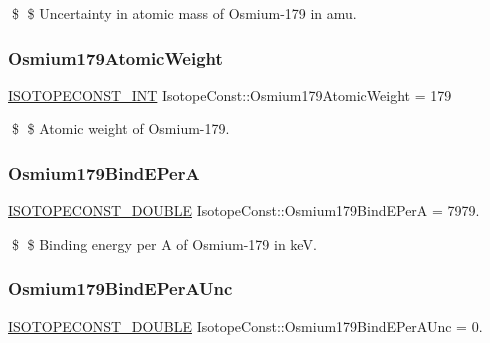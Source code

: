 \$ \$ Uncertainty in atomic mass of Osmium-\/179 in amu. \mbox{\label{group___isotope_const-_osmium-_os179_ga576c07028d0a757222f948e258fd2a59}} 
\subsubsection{\texorpdfstring{Osmium179\+Atomic\+Weight}{Osmium179AtomicWeight}}
{\footnotesize\ttfamily \mbox{\hyperlink{group___isotope_const-_macros_ga5f18360b3e99483a35c32d789e62621c}{I\+S\+O\+T\+O\+P\+E\+C\+O\+N\+S\+T\+\_\+\+I\+NT}} Isotope\+Const\+::\+Osmium179\+Atomic\+Weight = 179}

\$ \$ Atomic weight of Osmium-\/179. \mbox{\label{group___isotope_const-_osmium-_os179_gabe78cb734c8145deb53a080482f8cdcb}} 
\subsubsection{\texorpdfstring{Osmium179\+Bind\+E\+PerA}{Osmium179BindEPerA}}
{\footnotesize\ttfamily \mbox{\hyperlink{group___isotope_const-_macros_ga8f45a7272ce02c0b4c65c44636ed719a}{I\+S\+O\+T\+O\+P\+E\+C\+O\+N\+S\+T\+\_\+\+D\+O\+U\+B\+LE}} Isotope\+Const\+::\+Osmium179\+Bind\+E\+PerA = 7979.}

\$ \$ Binding energy per A of Osmium-\/179 in keV. \mbox{\label{group___isotope_const-_osmium-_os179_ga7823bfcbfc742c021ddafd324548614d}} 
\subsubsection{\texorpdfstring{Osmium179\+Bind\+E\+Per\+A\+Unc}{Osmium179BindEPerAUnc}}
{\footnotesize\ttfamily \mbox{\hyperlink{group___isotope_const-_macros_ga8f45a7272ce02c0b4c65c44636ed719a}{I\+S\+O\+T\+O\+P\+E\+C\+O\+N\+S\+T\+\_\+\+D\+O\+U\+B\+LE}} Isotope\+Const\+::\+Osmium179\+Bind\+E\+Per\+A\+Unc = 0.}

